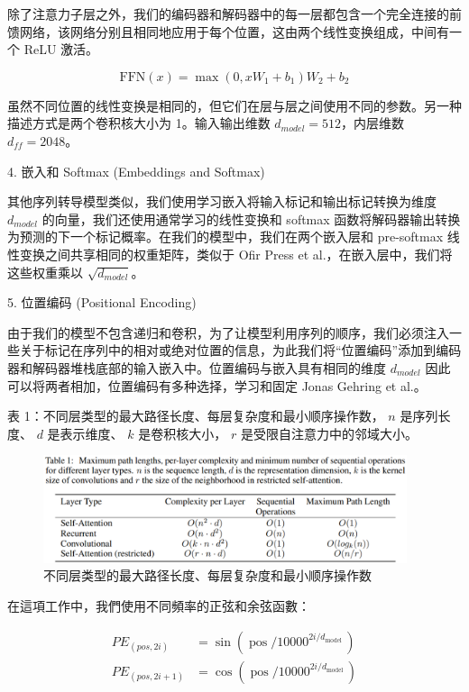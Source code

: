 除了注意力子层之外，我们的编码器和解码器中的每一层都包含一个完全连接的前馈网络，该网络分别且相同地应用于每个位置，这由两个线性变换组成，中间有一个 ReLU 激活。

\begin{equation}
\mathrm{FFN}(x)=\max \left(0, x W_{1}+b_{1}\right) W_{2}+b_{2}
\end{equation}

虽然不同位置的线性变换是相同的，但它们在层与层之间使用不同的参数。另一种描述方式是两个卷积核大小为 1。输入输出维数 $d_{model} = 512$，内层维数 $d_{ff} = 2048$。

4. 嵌入和 Softmax (Embeddings and Softmax)

其他序列转导模型类似，我们使用学习嵌入将输入标记和输出标记转换为维度 $d_{model}$ 的向量，我们还使用通常学习的线性变换和 softmax 函数将解码器输出转换为预测的下一个标记概率。在我们的模型中，我们在两个嵌入层和 pre-softmax 线性变换之间共享相同的权重矩阵，类似于 Ofir Press et al.，在嵌入层中，我们将这些权重乘以 $\sqrt{d_{model}}$。

5. 位置编码 (Positional Encoding)

由于我们的模型不包含递归和卷积，为了让模型利用序列的顺序，我们必须注入一些关于标记在序列中的相对或绝对位置的信息，为此我们将“位置编码”添加到编码器和解码器堆栈底部的输入嵌入中。位置编码与嵌入具有相同的维度 $d_{model}$ 因此可以将两者相加，位置编码有多种选择，学习和固定 Jonas Gehring et al.。

表 1：不同层类型的最大路径长度、每层复杂度和最小顺序操作数， $n$ 是序列长度、 $d$ 是表示维度、 $k$ 是卷积核大小， $r$ 是受限自注意力中的邻域大小。

\begin{figure}[htb]
\centering 
\includegraphics[width=0.95\textwidth]{img/t1.png} 
\caption{不同层类型的最大路径长度、每层复杂度和最小顺序操作数}
\label{Test}
\end{figure}

在這項工作中，我們使用不同頻率的正弦和余弦函數：

\begin{equation}
\begin{aligned}
P E_{(p o s, 2 i)} &=\sin \left(\operatorname{pos} / 10000^{2 i / d_{\text {model }}}\right) \\
P E_{(p o s, 2 i+1)} &=\cos \left(\operatorname{pos} / 10000^{2 i / d_{\text {model }}}\right)
\end{aligned}
\end{equation}

